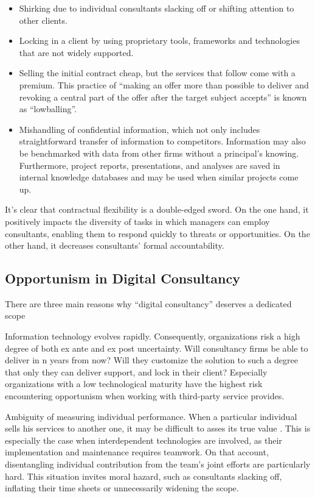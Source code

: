 \documentclass[12pt]{article}
\begin{document}
\begin{itemize}
\item
  Shirking due to individual consultants slacking off or shifting
  attention to other clients.
\item
  Locking in a client by using proprietary tools, frameworks and
  technologies that are not widely supported.
\item
  Selling the initial contract cheap, but the services that follow come
  with a premium. This practice of ``making an offer more than possible
  to deliver and revoking a central part of the offer after the target
  subject accepts'' \citep[ 219]{motes1979} is known as ``lowballing''.
\item
  Mishandling of confidential information, which not only includes
  straightforward transfer of information to competitors. Information
  may also be benchmarked with data from other firms without a
  principal's knowing. Furthermore, project reports, presentations, and
  analyses are saved in internal knowledge databases and may be used
  when similar projects come up. \citep[ 72-73]{armbruster2006}
\end{itemize}

It's clear that contractual flexibility is a double-edged sword. On the
one hand, it positively impacts the diversity of tasks in which managers
can employ consultants, enabling them to respond quickly to threats or
opportunities. On the other hand, it decreases consultants' formal
accountability.

\subsection{Opportunism in Digital
Consultancy}\label{opportunism-in-digital-consultancy}

There are three main reasons why ``digital consultancy'' deserves a
dedicated scope

Information technology evolves rapidly. Consequently, organizations risk
a high degree of both ex ante and ex post uncertainty. Will consultancy
firms be able to deliver in n years from now? Will they customize the
solution to such a degree that only they can deliver support, and lock
in their client? Especially organizations with a low technological
maturity have the highest risk encountering opportunism when working
with third-party service provides.

Ambiguity of measuring individual performance. When a particular
individual sells his services to another one, it may be difficult to
asses its true value \citep[ 134-135]{ouchi1980}. This is especially the
case when interdependent technologies are involved, as their
implementation and maintenance requires teamwork. On that account,
disentangling individual contribution from the team's joint efforts are
particularly hard. This situation invites moral hazard, such as
consultants slacking off, inflating their time sheets or unnecessarily
widening the scope.
\end{document}
